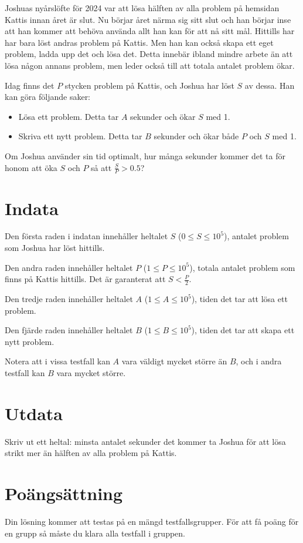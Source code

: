 Joshuas nyårslöfte för 2024 var att lösa hälften av alla problem på hemsidan Kattis innan året är slut.
Nu börjar året närma sig sitt slut och han börjar inse att han kommer att behöva använda allt han kan för
att nå sitt mål. Hittills har har bara löst andras problem på Kattis. Men han kan också skapa ett eget problem,
ladda upp det och lösa det. Detta innebär ibland mindre arbete än att lösa någon annans problem, men leder också
till att totala antalet problem ökar.

Idag finns det $P$ stycken problem på Kattis, och Joshua har löst $S$ av dessa. Han kan göra följande saker:

\begin{itemize}
  \item Lösa ett problem. Detta tar $A$ sekunder och ökar $S$ med 1.
  \item Skriva ett nytt problem. Detta tar $B$ sekunder och ökar både $P$ och $S$ med 1.
\end{itemize}

Om Joshua använder sin tid optimalt, hur många sekunder kommer det ta för honom att öka $S$ och $P$ så att
$\frac{S}{P} > 0.5$?

\section*{Indata}
Den första raden i indatan innehåller heltalet $S$ ($0 \leq S \leq 10^5$), antalet problem som Joshua har
löst hittills.

Den andra raden innehåller heltalet $P$ ($1 \leq P \leq 10^5$), totala antalet problem som finns
på Kattis hittills. Det är garanterat att $S < \frac{P}{2}$.

Den tredje raden innehåller heltalet $A$ ($1 \leq A \leq 10^5$), tiden det tar att lösa ett problem.

Den fjärde raden innehåller heltalet $B$ ($1 \leq B \leq 10^5$), tiden det tar att skapa ett nytt problem.

Notera att i vissa testfall kan $A$ vara väldigt mycket större än $B$, och i andra testfall kan $B$ vara mycket större.

\section*{Utdata}
Skriv ut ett heltal: minsta antalet sekunder det kommer ta Joshua för att lösa strikt mer än hälften
av alla problem på Kattis.

\section*{Poängsättning}
Din lösning kommer att testas på en mängd testfallsgrupper.
För att få poäng för en grupp så måste du klara alla testfall i gruppen.

